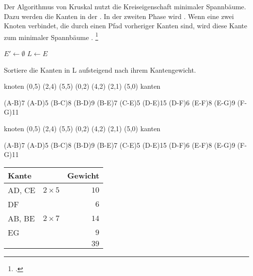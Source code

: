 \documentclass{lehramt-informatik-haupt}
\begin{document}
Der Algorithmus von Kruskal nutzt die Kreiseigenschaft minimaler
Spannbäume. Dazu werden die Kanten in der 
. In der zweiten Phase
wird . Wenn eine
 zwei Knoten verbindet, die  durch einen
Pfad vorheriger Kanten  sind, wird diese Kante zum
minimaler Spannbäume .
\footcite{wiki:kruskal}

\begin{algorithm}[H]

$E'\leftarrow \emptyset $\;
$L\leftarrow E$\;

Sortiere die Kanten in L aufsteigend nach ihrem Kantengewicht.\;

\caption{Minimaler Spannbaum nach Kruskal\footcite{wiki:kruskal}}
\end{algorithm}

\def\TmpGraph#1{
  \graph knoten {
    \knoten{A}(0,5)
    \knoten{B}(2,4)
    \knoten{C}(5,5)
    \knoten{D}(0,2)
    \knoten{E}(4,2)
    (2,1)
    (5,0)
  } kanten {
    #1
  }
}

\TmpGraph{
  \kante(A-B){7}
  \kante(A-D){5}
  \kante(B-C){8}
  \kante(B-D){9}
  \kante(B-E){7}
  \kante(C-E){5}
  \kante(D-E){15}
  \kante(D-F){6}
  \kante(E-F){8}
  \kante(E-G){9}
  \kante(F-G){11}
}

\begin{minipage}{7cm}
\TmpGraph{
  \KANTE(A-B){7}
  \KANTE(A-D){5}
  \kante(B-C){8}
  \kante(B-D){9}
  \KANTE(B-E){7}
  \KANTE(C-E){5}
  \kante(D-E){15}
  \KANTE(D-F){6}
  \kante(E-F){8}
  \KANTE(E-G){9}
  \kante(F-G){11}
}
\end{minipage}
\begin{minipage}{4cm}
\begin{center}
\begin{tabular}{|l|l|r|}
\hline
Kante & & Gewicht\\\hline\hline
AD, CE & $2 \times 5$ & $10$\\
DF     &              & $6$\\
AB, BE & $2 \times 7$ & $14$\\
EG     &              & $9$\\\hline
       &              & $39$\\\hline
\end{tabular}
\end{center}
\end{minipage}
\end{document}
